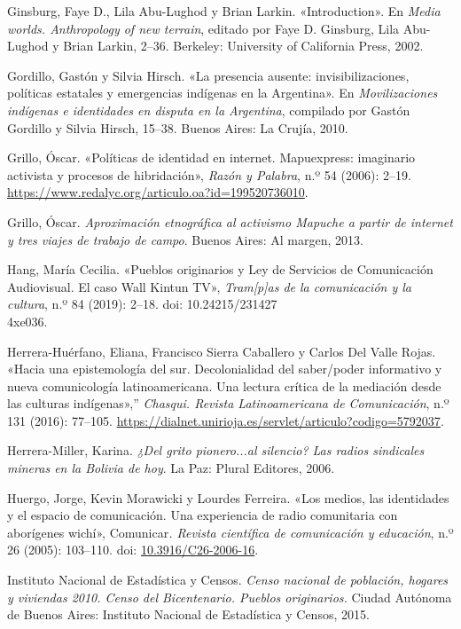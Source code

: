 \documentclass{tufte-handout}
\begin{document}
\begin{hangparas}{.25in}{1}
Ginsburg, Faye D., Lila Abu-Lughod y Brian Larkin. «Introduction». En
\emph{Media worlds. Anthropology of new terrain}, editado por Faye D.
Ginsburg, Lila Abu-Lughod y Brian Larkin, 2--36. Berkeley: University of
California Press, 2002.

Gordillo, Gastón y Silvia Hirsch. «La presencia ausente:
invisibilizaciones, políticas estatales y emergencias indígenas en la
Argentina». En \emph{Movilizaciones indígenas e identidades en disputa
en la Argentina}, compilado por Gastón Gordillo y Silvia Hirsch, 15--38.
Buenos Aires: La Crujía, 2010.

Grillo, Óscar. «Políticas de identidad en internet. Mapuexpress:
imaginario activista y procesos de hibridación», \emph{Razón y Palabra},
n.º 54 (2006): 2--19.
\url{https://www.redalyc.org/articulo.oa?id=199520736010}.

Grillo, Óscar. \emph{Aproximación etnográfica al activismo Mapuche a
partir de internet y tres viajes de trabajo de campo}. Buenos Aires: Al
margen, 2013.

Hang, María Cecilia. «Pueblos originarios y Ley de Servicios de
Comunicación Audiovisual. El caso Wall Kintun TV», \emph{Tram{[}p{]}as
de la comunicación y la cultura}, n.º 84 (2019): 2--18. doi:
10.24215/231427\\\hspace{.267in}4xe036.

Herrera-Huérfano, Eliana, Francisco Sierra Caballero y Carlos Del Valle
Rojas. «Hacia una epistemología del sur. Decolonialidad del saber/poder
informativo y nueva comunicología latinoamericana. Una lectura crítica
de la mediación desde las culturas indígenas»,'' \emph{Chasqui. Revista
Latinoamericana de Comunicación}, n.º 131 (2016): 77--105.
\url{https://dialnet.unirioja.es/servlet/articulo?codigo=5792037}.

Herrera-Miller, Karina. \emph{¿Del grito pionero...al silencio? Las
radios sindicales mineras en la Bolivia de hoy}. La Paz: Plural
Editores, 2006.

Huergo, Jorge, Kevin Morawicki y Lourdes Ferreira. «Los medios, las
identidades y el espacio de comunicación. Una experiencia de radio
comunitaria con aborígenes wichí», Comunicar\emph{. Revista científica
de comunicación y educación}, n.º 26 (2005): 103--110. doi:
\href{https://doi.org/10.3916/C26-2006-16}{10.3916/C26-2006-16}.

Instituto Nacional de Estadística y Censos. \emph{Censo nacional de
población, hogares y viviendas 2010. Censo del Bicentenario. Pueblos
originarios.} Ciudad Autónoma de Buenos Aires: Instituto Nacional de
Estadística y Censos, 2015.


\end{hangparas}
\end{document}
